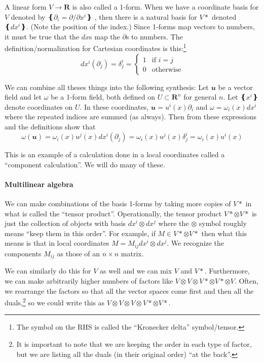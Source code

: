 A linear form $V→ 𝐑$ is also called a 1-form. When we have a coordinate basis for $V$ denoted by $❴∂_i= ∂/∂x^i❵$ , then there is a natural basis for $V*$ denoted $❴dx^i❵$. (Note the position of the index.) Since 1-forms map vectors to numbers, it must be true that the $dx$s map the $∂$s to numbers. The definition/normalization for Cartesian coordinates is this:\footnote{The symbol on the RHS is called the “Kronecker delta” symbol/tensor.}
$$
dx^i ( ∂_j ) = δ^i_j = \begin{cases} 
	1 & \textrm{if } i=j\\
	0 & \textrm{otherwise}
	\end{cases}
$$

\begin{exercise}
We can combine all theses things into the following synthesis: Let $𝒖$ be a vector field and let $ω$ be a 1-form field, both defined on $U⊂ 𝐑^n$ for general $n$. Let $❴x^i❵$ denote coordinates on $U$. In these coordinates, $𝒖=u^i(x) ∂_i$ and $ω = ω_i(x) dx^i$ where the repeated indices are summed (as always). Then from these expressions and the definitions show that 
$$
ω(𝒖) = ω_i(x) u^j(x) dx^i(∂_j) = ω_i(x) u^j(x) δ^i_j = ω_i(x) u^i(x)
$$
\end{exercise}
This is an example of a calculation done in a local coordinates called a “component calculation”. We will do many of these. 

\paragraph{Multilinear algebra}
We can make combinations of the basis 1-forms by taking more copies of $V*$ in what is called the “tensor product”. Operationally, the tensor product $V*⊗V*$ is just the collection of objects with basis $dx^i ⊗ dx^j$ where the $⊗$ symbol roughly means “keep them in this order”. For example, if $M ∈ V*⊗V*$ then what this means is that in local coordinates $M = M_{ij} dx^i ⊗ dx^j$. We recognize the components $M_{ij}$ as those of an $n× n$ matrix. 

We can similarly do this for $V$ as well and we can mix $V$ and $V*$. Furthermore, we can make arbitrarily higher numbers of factors like $V ⊗ V ⊗ V* ⊗ V* ⊗ V$. Often, we rearrange the factors so that all the vector spaces come first and then all the duals,\footnote{It is important to note that we are keeping the order in each type of factor, but we are listing all the duals (in their original order) “at the back”.} so we could write this as $V ⊗ V ⊗ V ⊗ V* ⊗ V*$. 

